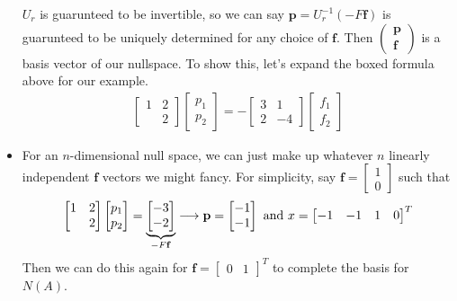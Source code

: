 \documentclass[11pt]{article}
\begin{document}
\begin{itemize}
   $U_r$ is guarunteed to be invertible, so we can say
	   $\mathbf{p} = U_{r}^{-1}(-F \mathbf{f})$
   is guarunteed to be uniquely determined for any choice of $\mathbf{f}$. Then $\begin{pmatrix}
	   \mathbf{p}\\
	   \mathbf{f}
   \end{pmatrix}$ is a basis vector of our nullspace. To show this, let's expand the boxed formula above for our example.
   \begin{align}
       \begin{bmatrix}
         1 & 2\\
        & 2
       \end{bmatrix}
	   \begin{bmatrix}
	     p_{1}\\
	   p_{2}
	   \end{bmatrix}
	   =-\begin{bmatrix}
	     3 & 1\\
	   2 & -4
	   \end{bmatrix}
	   \begin{bmatrix}
	     f_{1}\\
	   f_{2}
	   \end{bmatrix}
   \end{align}
\item For an $n$-dimensional null space, we can just make up whatever $n$ linearly independent $\mathbf{f}$ vectors we might fancy. For simplicity, say $\mathbf{f} = \begin{bmatrix}
  1\\
0
\end{bmatrix}$ such that
   \begin{align}
       \begin{bmatrix}
         1 & 2\\
        & 2
       \end{bmatrix}
	   \begin{bmatrix}
	     p_{1}\\
	   p_{2}
	   \end{bmatrix}
	   =\underbrace{\begin{bmatrix}
	     -3 \\ -2\\
 \end{bmatrix}}_{-F \mathbf{f}} \longrightarrow \mathbf{p}= \begin{bmatrix} -1 \\ -1 \end{bmatrix} \text{ and }x = \begin{bmatrix}
   -1 & -1 & 1 & 0
\end{bmatrix}^{T}
   \end{align}
   Then we can do this again for $\mathbf{f} = \begin{bmatrix}
     0 & 1
   \end{bmatrix}^{T}$ to complete the basis for $N(A)$.
   

\end{itemize}
\end{document}
